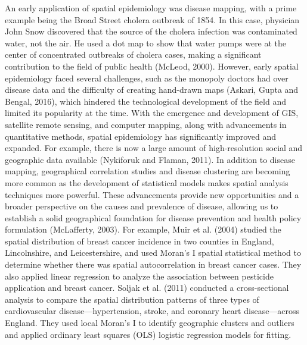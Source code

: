An early application of spatial epidemiology was disease mapping, with a prime example being the Broad Street cholera outbreak of 1854. In this case, physician John Snow discovered that the source of the cholera infection was contaminated water, not the air. He used a dot map to show that water pumps were at the center of concentrated outbreaks of cholera cases, making a significant contribution to the field of public health (McLeod, 2000). However, early spatial epidemiology faced several challenges, such as the monopoly doctors had over disease data and the difficulty of creating hand-drawn maps (Askari, Gupta and Bengal, 2016), which hindered the technological development of the field and limited its popularity at the time. With the emergence and development of GIS, satellite remote sensing, and computer mapping, along with advancements in quantitative methods, spatial epidemiology has significantly improved and expanded. For example, there is now a large amount of high-resolution social and geographic data available (Nykiforuk and Flaman, 2011). In addition to disease mapping, geographical correlation studies and disease clustering are becoming more common as the development of statistical models makes spatial analysis techniques more powerful. These advancements provide new opportunities and a broader perspective on the causes and prevalence of disease, allowing us to establish a solid geographical foundation for disease prevention and health policy formulation (McLafferty, 2003). For example, Muir et al. (2004) studied the spatial distribution of breast cancer incidence in two counties in England, Lincolnshire, and Leicestershire, and used Moran's I spatial statistical method to determine whether there was spatial autocorrelation in breast cancer cases. They also applied linear regression to analyze the association between pesticide application and breast cancer. Soljak et al. (2011) conducted a cross-sectional analysis to compare the spatial distribution patterns of three types of cardiovascular disease—hypertension, stroke, and coronary heart disease—across England. They used local Moran's I to identify geographic clusters and outliers and applied ordinary least squares (OLS) logistic regression models for fitting.

